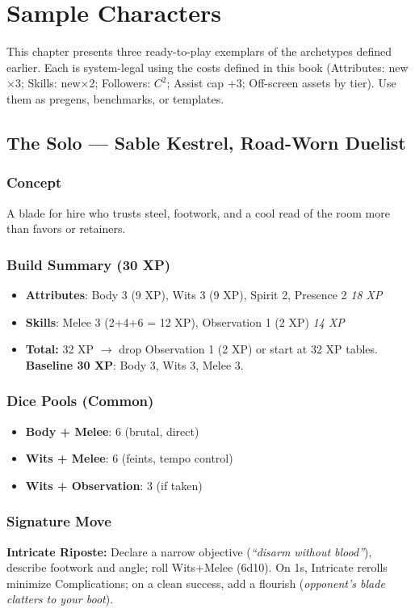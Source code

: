 \documentclass[12pt]{book}
\begin{document}
\chapter{Sample Characters}

This chapter presents three ready-to-play exemplars of the archetypes defined earlier. Each is system-legal using the costs defined in this book (Attributes: new$\times$3; Skills: new$\times$2; Followers: $C^2$; Assist cap +3; Off-screen assets by tier). Use them as pregens, benchmarks, or templates.

\section{The Solo — Sable Kestrel, Road-Worn Duelist}

\subsection*{Concept}
A blade for hire who trusts steel, footwork, and a cool read of the room more than favors or retainers.

\subsection*{Build Summary (30 XP)}
\begin{itemize}
  \item \textbf{Attributes}: Body 3 (9 XP), Wits 3 (9 XP), Spirit 2, Presence 2 \hfill \emph{18 XP}
  \item \textbf{Skills}: Melee 3 (2+4+6 = 12 XP), Observation 1 (2 XP) \hfill \emph{14 XP}
  \item \textbf{Total:} 32 XP $\rightarrow$ drop Observation 1 (2 XP) or start at 32 XP tables. \textbf{Baseline 30 XP}: Body 3, Wits 3, Melee 3.
\end{itemize}

\subsection*{Dice Pools (Common)}
\begin{itemize}
  \item \textbf{Body + Melee}: 6 (brutal, direct)
  \item \textbf{Wits + Melee}: 6 (feints, tempo control)
  \item \textbf{Wits + Observation}: 3 (if taken)
\end{itemize}

\subsection*{Signature Move}
\textbf{Intricate Riposte:} Declare a narrow objective (\emph{``disarm without blood''}), describe footwork and angle; roll Wits+Melee (6d10). On 1s, Intricate rerolls minimize Complications; on a clean success, add a flourish (\emph{opponent’s blade clatters to your boot}).
\end{document}
